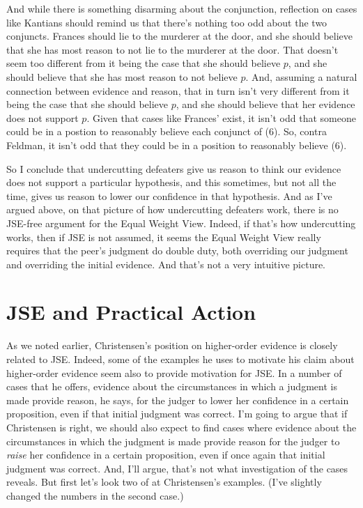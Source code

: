 And while there is something disarming about the conjunction, reflection on cases like Kantians should remind us that there's nothing too odd about the two conjuncts. Frances should lie to the murderer at the door, and she should believe that she has most reason to not lie to the murderer at the door. That doesn't seem too different from it being the case that she should believe \(p\), and she should believe that she has most reason to not believe \(p\). And, assuming a natural connection between evidence and reason, that in turn isn't very different from it being the case that she should believe \(p\), and she should believe that her evidence does not support \(p\). Given that cases like Frances' exist, it isn't odd that someone could be in a postion to reasonably believe each conjunct of (6). So, contra Feldman, it isn't odd that they could be in a position to reasonably believe (6). 

So I conclude that undercutting defeaters give us reason to think our evidence does not support a particular hypothesis, and this sometimes, but not all the time, gives us reason to lower our confidence in that hypothesis. And as I've argued above, on that picture of how undercutting defeaters work, there is no JSE-free argument for the Equal Weight View. Indeed, if that's how undercutting works, then if JSE is not assumed, it seems the Equal Weight View really requires that the peer's judgment do double duty, both overriding our judgment and overriding the initial evidence. And that's not a very intuitive picture.

\section{JSE and Practical Action}
As we noted earlier, Christensen's position on higher-order evidence is closely related to JSE. Indeed, some of the examples he uses to motivate his claim about higher-order evidence seem also to provide motivation for JSE. In a number of cases that he offers, evidence about the circumstances in which a judgment is made provide reason, he says, for the judger to lower her confidence in a certain proposition, even if that initial judgment was correct. I'm going to argue that if Christensen is right, we should also expect to find cases where evidence about the circumstances in which the judgment is made provide reason for the judger to \textit{raise} her confidence in a certain proposition, even if once again that initial judgment was correct. And, I'll argue, that's not what investigation of the cases reveals. But first let's look two of at Christensen's examples. (I've slightly changed the numbers in the second case.)

